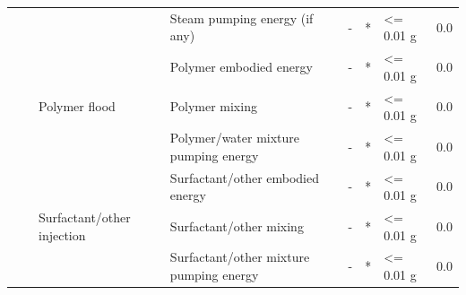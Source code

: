 \documentclass[11pt]{report}
\begin{document}
{{{{\begin{landscape}
\begin{table}
\begin{scriptsize}
\begin{tabular}{|p{}|p{}|p{}|p{}|p{}|p{}|p{}|p{}|}
\cline{4-8}
& & & Steam pumping energy (if any) & - & * & <= 0.01 g & 0.0\\
\cline{3-8}
& & \multirow{3}{*}{Polymer flood} & Polymer embodied energy & - & * & <= 0.01 g & 0.0\\
\cline{4-8}
& & & Polymer mixing & - & * & <= 0.01 g & 0.0\\
\cline{4-8}
& & & Polymer/water mixture pumping energy & - & * & <= 0.01 g & 0.0\\
\cline{3-8}
& & \multirow{3}{0.12\columnwidth}{Surfactant/other injection} & Surfactant/other embodied energy & - & * & <= 0.01 g & 0.0\\
\cline{4-8}
& & & Surfactant/other mixing & - & * & <= 0.01 g & 0.0\\
\cline{4-8}
& & & Surfactant/other mixture pumping energy & - & * & <= 0.01 g & 0.0\\
\hline
\end{tabular}
\end{scriptsize}
\end{table}



\end{landscape}}}}}
\end{document}
